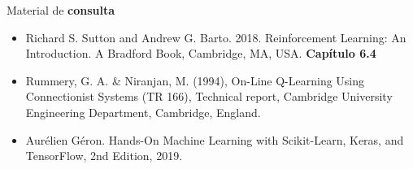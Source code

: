 \documentclass{beamer}
\begin{document}
\begin{frame}{Material de \textbf{consulta}}
\begin{itemize}
  \item Richard S. Sutton and Andrew G. Barto. 2018. Reinforcement Learning: An Introduction. A Bradford Book, Cambridge, MA, USA. \textbf{Capítulo 6.4} 
  \item Rummery, G. A. \& Niranjan, M. (1994), On-Line Q-Learning Using Connectionist Systems (TR 166), Technical report, Cambridge University Engineering Department, Cambridge, England.
  \item Aurélien Géron. Hands-On Machine Learning with Scikit-Learn, Keras, and TensorFlow, 2nd Edition, 2019. 
\end{itemize}
\end{frame}
\end{document}
